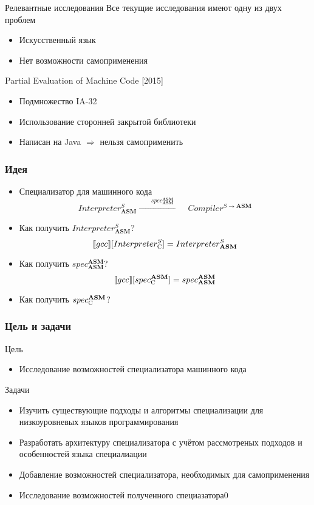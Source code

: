 \documentclass[demo]{beamer}
\begin{document}
\begin{frame}{Релевантные исследования}
  Все текущие исследования имеют одну из двух проблем
  \begin{itemize}
  \item Искусственный язык
    \vfill
  \item Нет возможности самоприменения
  \end{itemize}
  \vfill
  Partial Evaluation of Machine Code \hfill [2015]
    \begin{itemize}
    \item Подмножество IA-32
    \vfill
    \item Использование сторонней закрытой библиотеки
    \vfill
    \item \large Написан на Java $\Rightarrow$ нельзя самоприменить
  	\end{itemize}
\end{frame}

\begin{frame}\frametitle{Идея}
  \begin{itemize}
  \item {Специализатор для машинного кода
      $$Interpreter^{S}_{\mathbf{ASM}}
      \xrightarrow{\qquad spec^{ \mathbf{ASM}}_{\mathbf{ASM}}\qquad} Compiler^{S \to \mathbf{ASM}}$$
    }
    \vfill
  \item {Как получить $Interpreter^{S}_{\mathbf{ASM}}$?
      $$\llbracket gcc \rrbracket [Interpreter^{S}_{\textsc{C}}] =
      Interpreter^{S}_{\mathbf{ASM}}$$}
    \vfill
  \item {Как получить $spec^{\mathbf{ASM}}_{\mathbf{ASM}}$?
      $$\llbracket gcc \rrbracket [spec^{ \mathbf{ASM}}_{\textsc{C}}] =
      spec^{\mathbf{ASM}}_{\mathbf{ASM}}$$}
    \vfill
  \item{Как получить $spec^{\mathbf{ASM}}_{\textsc{C}}$?}
    \vfill
  \end{itemize}
\end{frame}

\begin{frame}\frametitle{Цель и задачи}
\begin{block}{Цель}
\begin{itemize}
\item Исследование возможностей специализатора машинного кода
\end{itemize}
\end{block}
\begin{block}{Задачи}
\begin{itemize}
\item Изучить существующие подходы и алгоритмы специализации для низкоуровневых языков программирования
\item Разработать архитектуру специализатора с учётом рассмотреных подходов и особенностей языка специалиации
\item Добавление возможностей специализатора, необходимых для самоприменения 
\item Исследование возможностей полученного специазатора0
\end{itemize}
\end{block}
\end{frame}
\end{document}
